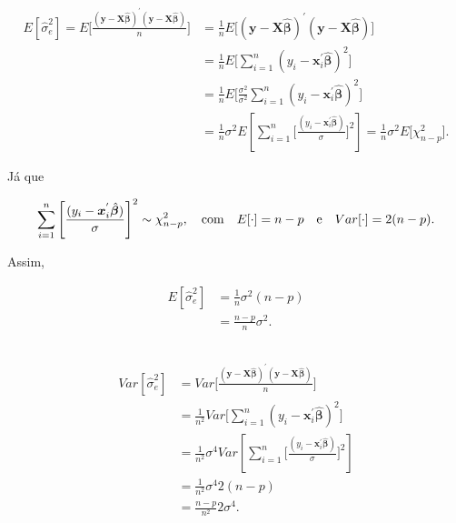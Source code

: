 \documentclass[12pt, oldfontcommands]{article}\usepackage[]{graphicx}\usepackage[]{color}
\begin{document}
\begin{align*}
 E[\hat{\sigma}_{e}^{2}] = E\bigg[\frac{
 (\mathbf{y} - \mathbf{X} \hat{\bm{\beta}})^{'}
 (\mathbf{y} - \mathbf{X} \hat{\bm{\beta}})}{n}\bigg] & = \frac{1}{n}
 E\Big[(\mathbf{y} - \mathbf{X} \hat{\bm{\beta}})^{'}
       (\mathbf{y} - \mathbf{X} \hat{\bm{\beta}})\Big] \\ & =
 \frac{1}{n} E\Bigg[\sum_{i = 1}^{n}
 (y_{i} - \bm{x}_{i}^{'}\hat{\bm{\beta}})^{2}\Bigg] \\ & = \frac{1}{n}
 E\Bigg[\frac{\sigma^{2}}{\sigma^{2}} \sum_{i = 1}^{n}
        (y_{i} - \bm{x}_{i}^{'}\hat{\bm{\beta}})^{2}\Bigg] \\ & =
 \frac{1}{n} \sigma^{2} E\left[\sum_{i = 1}^{n}
 \Bigg[\frac{(y_{i} - \bm{x}_{i}^{'}\hat{\bm{\beta}})}{\sigma}\Bigg]^{2}
 \right] = \frac{1}{n} \sigma^{2} E\Big[\chi_{n - p}^{2}\Big].
\end{align*}

Já que

\[ \sum_{i = 1}^{n} \Bigg[
   \frac{(y_{i} -\bm{x}_{i}^{'}\hat{\bm{\beta}})}{\sigma}\Bigg]^{2} \sim
   \chi_{n - p}^{2}, \quad {\rm com} \quad E[\cdot] = n - p \quad
   {\rm e} \quad Var[\cdot] = 2 (n - p).\]

Assim,

\begin{multicols}{2}
\begin{align*}
 E[\hat{\sigma}_{e}^{2}] & = \frac{1}{n} \sigma^{2} (n - p) \\
                         & = \frac{n - p}{n} \sigma^{2}.
\\ \\ \\ \\ \\
\end{align*}
\begin{align*}
 Var[\hat{\sigma}_{e}^{2}] & =
 Var\bigg[\frac{(\mathbf{y} - \mathbf{X} \hat{\bm{\beta}})^{'}
                (\mathbf{y} - \mathbf{X} \hat{\bm{\beta}})}{n}\bigg] \\
 & = \frac{1}{n^{2}} Var\bigg[
     \sum_{i = 1}^{n} (y_{i} - \bm{x}_{i}^{'}\hat{\bm{\beta}})^{2}\bigg]
 \\ & = \frac{1}{n^{2}} \sigma^{4} Var\left[\sum_{i = 1}^{n}
 \Bigg[\frac{(y_{i} - \bm{x}_{i}^{'}\hat{\bm{\beta}})}{\sigma}\Bigg]^{2}
 \right] \\ & = \frac{1}{n^{2}} \sigma^{4} 2 (n - p) \\
 & = \frac{n - p}{n^{2}} 2 \sigma^{4}.
\end{align*}
\end{multicols}
\end{document}
